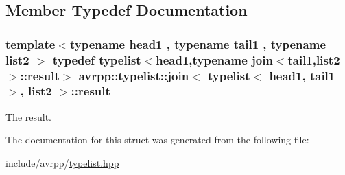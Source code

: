 \subsection{Member Typedef Documentation}
\hypertarget{structavrpp_1_1typelist_1_1join_3_01typelist_3_01head1_00_01tail1_01_4_00_01list2_01_4_a1f21b80468444f4b68737771e19cb8fb}{
\subsubsection[{result}]{\setlength{\rightskip}{0pt plus 5cm}template$<$typename head1 , typename tail1 , typename list2 $>$ typedef {\bf typelist}$<$head1,typename join$<$tail1,list2$>$::{\bf result}$>$ avrpp::typelist::join$<$ {\bf typelist}$<$ head1, tail1 $>$, list2 $>$::{\bf result}}}
\label{structavrpp_1_1typelist_1_1join_3_01typelist_3_01head1_00_01tail1_01_4_00_01list2_01_4_a1f21b80468444f4b68737771e19cb8fb}


The result. 



The documentation for this struct was generated from the following file:\begin{DoxyCompactItemize}
\item 
include/avrpp/\hyperlink{typelist_8hpp}{typelist.hpp}\end{DoxyCompactItemize}
